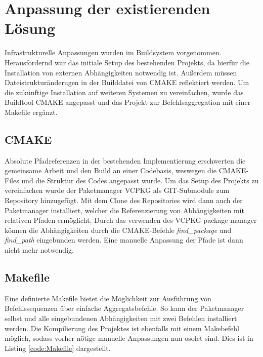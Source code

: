 \section{Anpassung der existierenden Lösung}
Infrastrukturelle Anpassungen wurden im Buildsystem vorgenommen. Herausfordernd war das initiale Setup des bestehenden
Projekts, da hierfür die Installation von externen Abhängigkeiten notwendig ist. Außerdem müssen Dateistrukturänderugen
in der Builddatei von CMAKE reflektiert werden. Um die zukünftige Installation auf weiteren Systemen zu vereinfachen,
wurde das Buildtool CMAKE angepasst und das Projekt zur Befehlsaggregation mit einer Makefile ergänzt.


\subsection{CMAKE}
\label{sec:cmake}
Absolute Pfadreferenzen in der bestehenden Implementierung erschwerten die gemeinsame Arbeit und den Build an einer
Codebasis, weswegen die CMAKE-Files und die Struktur des Codes angepasst wurde. Um das Setup des Projekts zu
vereinfachen wurde der Paketmanager VCPKG als GIT-Submodule zum Repository hinzugefügt. Mit dem Clone des Repositories
wird dann auch der Paketmanager installiert, welcher die Referenzierung von Abhängigkeiten mit relativen Pfaden
ermöglicht. Durch das verwenden des VCPKG package manager können die Abhängigkeiten durch die CMAKE-Befehle
\textit{find\_package} und \textit{find\_path} eingebunden werden. Eine manuelle Anpassung der Pfade ist dann nicht mehr
notwendig.\\


\subsection{Makefile}
Eine definierte Makefile bietet die Möglichkeit zur Ausführung von Befehlssequenzen über einfache Aggregatsbefehle.
So kann der Paketmanager selbst und alle eingebundenen Abhängigkeiten mit zwei Befehlen installiert werden.
Die Kompilierung des Projektes ist ebenfalls mit einem Makebefehl möglich, sodass vorher nötige manuelle Anpassungen nun
osolet sind. Dies ist in Listing \ref{code:Makefile} dargestellt.\\

